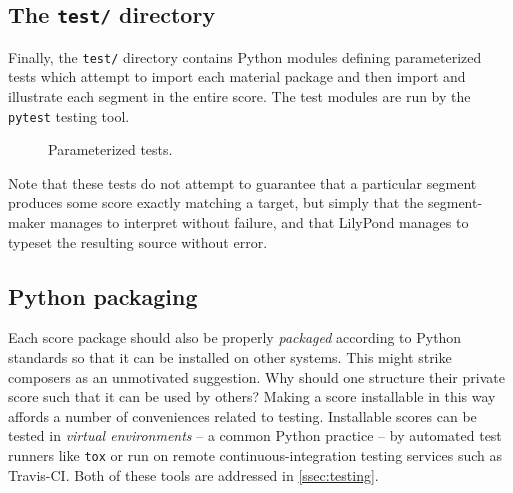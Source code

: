 \subsection{The \texttt{test/} directory}
\label{ssec:the-test-directory}

Finally, the \texttt{test/} directory contains Python modules defining
parameterized tests which attempt to import each material package and then
import and illustrate each segment in the entire score. The test modules are
run by the \texttt{pytest} testing tool.

\begin{figure}[h!]
\begin{singlespacing}
\vspace{-0.5\baselineskip}
\end{singlespacing}
\caption{Parameterized tests.}
\end{figure}

Note that these tests do not attempt to guarantee that a particular segment
produces some score exactly matching a target, but simply that the
segment-maker manages to interpret without failure, and that LilyPond manages
to typeset the resulting source without error.

\subsection{Python packaging}
\label{ssec:python-packaging}

Each score package should also be properly \emph{packaged} according to Python
standards so that it can be installed on other systems. This might strike
composers as an unmotivated suggestion. Why should one structure their private
score such that it can be used by others? Making a score installable in this
way affords a number of conveniences related to testing. Installable scores can
be tested in \emph{virtual environments} -- a common Python practice -- by
automated test runners like \texttt{tox} or run on remote
continuous-integration testing services such as Travis-CI. Both of these tools
are addressed in \autoref{ssec:testing}.

